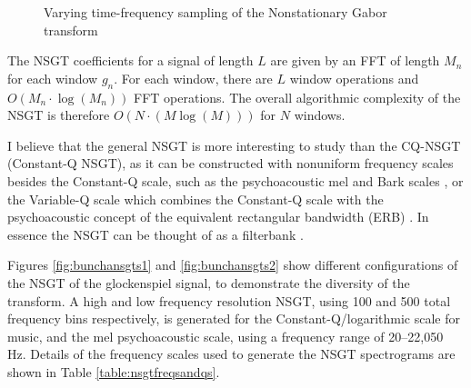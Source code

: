 \documentclass[report.tex]{subfiles}
\begin{document}
\begin{figure}[ht]
	\centering
	\hspace{1em}
	\caption{Varying time-frequency sampling of the Nonstationary Gabor transform \parencite[1,485, 1,487]{balazs}}
	\label{fig:nonuniformtflattices}
\end{figure}

The NSGT coefficients for a signal of length $L$ are given by an FFT of length $M_{n}$ for each window $g_{n}$. For each window, there are $L$ window operations and $O(M_{n} \cdot \log(M_{n}))$ FFT operations. The overall algorithmic complexity of the NSGT is therefore $O(N \cdot (M \log(M)))$ for $N$ windows.

I believe that the general NSGT is more interesting to study than the CQ-NSGT (Constant-Q NSGT), as it can be constructed with nonuniform frequency scales besides the Constant-Q scale, such as the psychoacoustic mel and Bark scales \parencite{melbook}, or the Variable-Q scale which combines the Constant-Q scale with the psychoacoustic concept of the equivalent rectangular bandwidth (ERB) \parencite{variableq1, variableq2}. In essence the NSGT can be thought of as a filterbank \parencite{variableq1}.

Figures \ref{fig:bunchansgts1} and \ref{fig:bunchansgts2} show different configurations of the NSGT of the glockenspiel signal, to demonstrate the diversity of the transform. A high and low frequency resolution NSGT, using 100 and 500 total frequency bins respectively, is generated for the Constant-Q/logarithmic scale for music, and the mel psychoacoustic scale, using a frequency range of 20--22,050 Hz. Details of the frequency scales used to generate the NSGT spectrograms are shown in Table \ref{table:nsgtfreqsandqs}.
\end{document}
